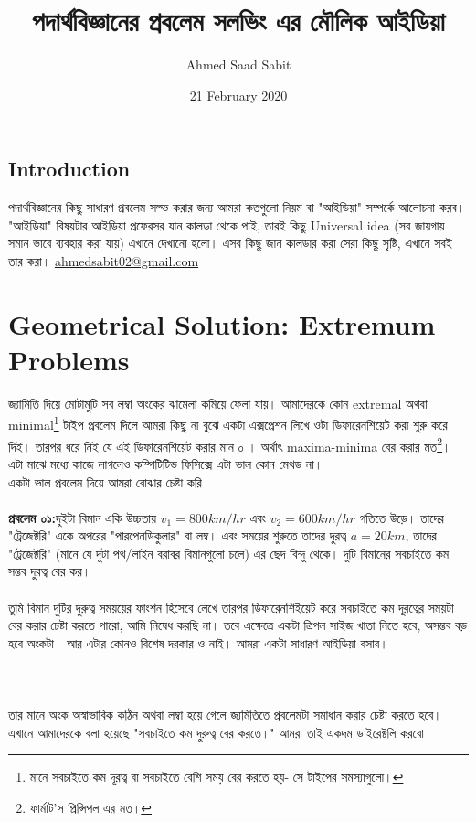 \documentclass[12pt,a4paper]{article}
\title{পদার্থবিজ্ঞানের প্রবলেম সলভিং এর মৌলিক আইডিয়া}
\author{Ahmed Saad Sabit}
\date{21 February 2020}
\begin{document}
\maketitle
\subsection{Introduction}

পদার্থবিজ্ঞানের কিছু সাধারণ প্রবলেম সল্ভ করার জন্য আমরা কতগুলো নিয়ম বা "আইডিয়া" সম্পর্কে আলোচনা করব। "আইডিয়া" বিষয়টার আইডিয়া প্রফেরসর যান কালডা থেকে পাই, তারই কিছু Universal idea (সব জায়গায় সমান ভাবে ব্যবহার করা যায়) এখানে দেখানো হলো। এসব কিছু জান কালডার করা সেরা কিছু সৃষ্টি, এখানে সবই তার করা।
\url{ahmedsabit02@gmail.com}

\section{Geometrical Solution: Extremum Problems}
জ্যামিতি দিয়ে মোটামুটি সব লম্বা অংকের ঝামেলা কমিয়ে ফেলা যায়। আমাদেরকে কোন extremal অথবা minimal\footnote{মানে সবচাইতে কম দূরত্ব বা সবচাইতে বেশি সময় বের করতে হয়- সে টাইপের সমস্যাগুলো।} টাইপ প্রবলেম দিলে আমরা কিছু না বুঝে একটা এক্সপ্রেশন লিখে ওটা ডিফারেনশিয়েট করা শুরু করে দিই। তারপর ধরে নিই যে এই ডিফারেনশিয়েট করার মান ০ । অর্থাৎ maxima-minima বের করার মত\footnote{ফার্মাট'স প্রিন্সিপল এর মত।}। এটা মাঝে মধ্যে কাজে লাগলেও কম্পিটিটিভ ফিসিক্সে এটা ভাল কোন মেথড না।\\
%
একটা ভাল প্রবলেম দিয়ে আমরা বোঝার চেষ্টা করি। \\
\\
\textbf{প্রবলেম ০১:}দুইটা বিমান একি উচ্চতায় $v_1=800km/hr$ এবং $v_2 = 600km/hr$ গতিতে উড়ে। তাদের "ট্রেজেক্টরি" একে অপরের "পারপেনডিকুলার" বা লম্ব। এবং সময়ের শুরুতে তাদের দুরত্ব $a=20km$, তাদের "ট্রেজেক্টরি" (মানে যে দুটা পথ/লাইন বরাবর বিমানগুলো চলে) এর ছেদ বিন্দু থেকে। দুটি বিমানের সবচাইতে কম সম্ভব দুরত্ব বের কর। \\
\\
তুমি বিমান দুটির দুরুত্ব সময়য়ের ফাংশন হিসেবে লেখে তারপর ডিফারেনশিইয়েট করে সবচাইতে কম দূরত্বের সময়টা বের করার চেষ্টা করতে পারো, আমি নিষেধ করছি না। তবে এক্ষেত্রে একটা ত্রিপল সাইজ খাতা নিতে হবে, অসম্ভব বড় হবে অংকটা। আর এটার কোনও বিশেষ দরকার ও নাই। আমরা একটা সাধারণ আইডিয়া বসাব।\\
\\
 \\
\\ %
তার মানে অংক অস্বাভাবিক কঠিন অথবা লম্বা হয়ে গেলে জ্যমিতিতে প্রবলেমটা সমাধান করার চেষ্টা করতে হবে। এখানে আমাদেরকে বলা হয়েছে "সবচাইতে কম দুরুত্ব বের করতে।" আমরা তাই একদম ডাইরেক্টলি করবো। \\
\end{document}
